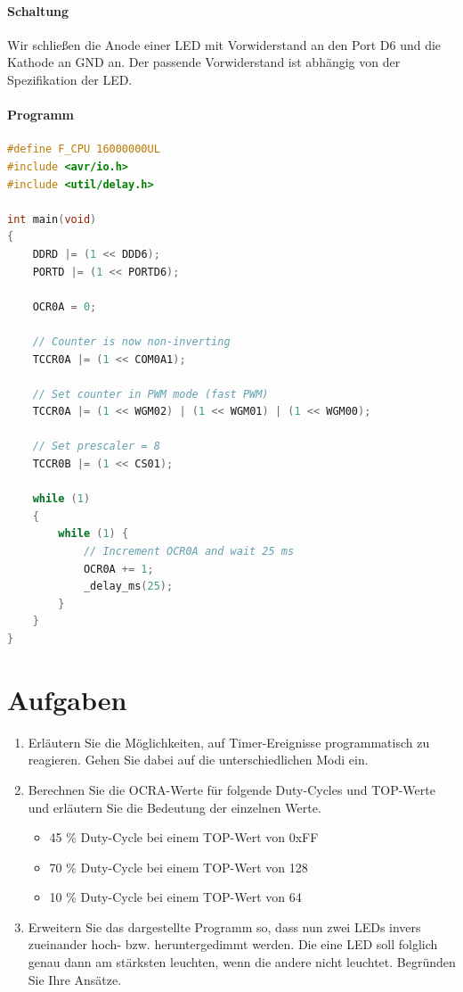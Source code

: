 \documentclass[11pt,a4paper]{scrartcl}
\begin{document}
\paragraph{Schaltung}
Wir schließen die Anode einer LED mit Vorwiderstand an den Port D6 und die Kathode an GND an. Der passende Vorwiderstand ist abhängig von der Spezifikation der LED.
\paragraph{Programm} \quad
\begin{lstlisting}[language=C]
#define F_CPU 16000000UL
#include <avr/io.h>
#include <util/delay.h>

int main(void)
{
	DDRD |= (1 << DDD6);
	PORTD |= (1 << PORTD6);
	
	OCR0A = 0;
	
	// Counter is now non-inverting
	TCCR0A |= (1 << COM0A1);
	
	// Set counter in PWM mode (fast PWM)
	TCCR0A |= (1 << WGM02) | (1 << WGM01) | (1 << WGM00);
	
	// Set prescaler = 8
	TCCR0B |= (1 << CS01);
    
    while (1) 
    {
		while (1) {
			// Increment OCR0A and wait 25 ms
			OCR0A += 1;
			_delay_ms(25);
		}
	}
}
\end{lstlisting}
\section*{Aufgaben}
\begin{enumerate}
\item Erläutern Sie die Möglichkeiten, auf Timer-Ereignisse programmatisch zu reagieren. Gehen Sie dabei auf die unterschiedlichen Modi ein.
\item Berechnen Sie die OCRA-Werte für folgende Duty-Cycles und TOP-Werte und erläutern Sie die Bedeutung der einzelnen Werte.
\begin{itemize}
\item 45 \% Duty-Cycle bei einem TOP-Wert von 0xFF
\item 70 \% Duty-Cycle bei einem TOP-Wert von 128
\item 10 \% Duty-Cycle bei einem TOP-Wert von 64
\end{itemize}
\item Erweitern Sie das dargestellte Programm so, dass nun zwei LEDs invers zueinander hoch- bzw. heruntergedimmt werden. Die eine LED soll folglich genau dann am stärksten leuchten, wenn die andere nicht leuchtet. Begründen Sie Ihre Ansätze.
\end{enumerate}
\end{document}

